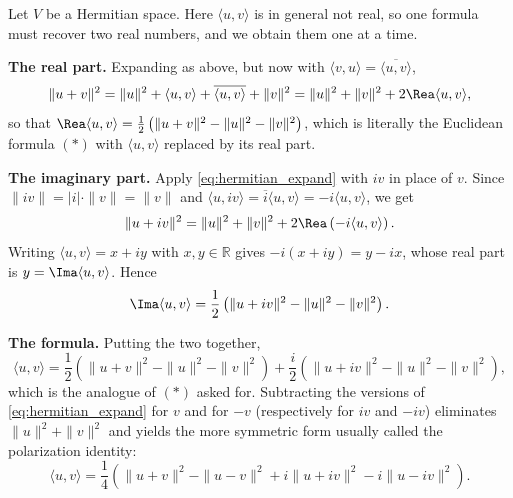 \begin{exercisesolution*}
\label{sol:polarization_b}
  Let $V$ be a Hermitian space. Here $\langle u, v \rangle$ is in general not real, so one formula must recover two real numbers, and we obtain them one at a time.

  \textbf{The real part.} Expanding as above, but now with $\langle v, u \rangle = \overline{\langle u, v \rangle}$,
  \begin{equation} \label{eq:hermitian_expand}
    \|u+v\|^2 = \|u\|^2 + \langle u, v \rangle + \overline{\langle u, v \rangle} + \|v\|^2 = \|u\|^2 + \|v\|^2 + 2 \Rea \langle u, v \rangle,
  \end{equation}
  so that $\Rea \langle u, v \rangle = \frac{1}{2}\left( \|u+v\|^2 - \|u\|^2 - \|v\|^2 \right)$, which is literally the Euclidean formula $(*)$ with $\langle u, v \rangle$ replaced by its real part.

  \textbf{The imaginary part.} Apply \eqref{eq:hermitian_expand} with $iv$ in place of $v$. Since $\|iv\| = |i| \cdot \|v\| = \|v\|$ and $\langle u, iv \rangle = \overline{i} \langle u, v \rangle = -i \langle u, v \rangle$, we get
  \[ \|u + iv\|^2 = \|u\|^2 + \|v\|^2 + 2 \Rea \left( -i \langle u, v \rangle \right). \]
  Writing $\langle u, v \rangle = x + iy$ with $x, y \in \mathbb{R}$ gives $-i(x+iy) = y - ix$, whose real part is $y = \Ima \langle u, v \rangle$. Hence
  \[ \Ima \langle u, v \rangle = \frac{1}{2}\left( \|u+iv\|^2 - \|u\|^2 - \|v\|^2 \right). \]

  \textbf{The formula.} Putting the two together,
  \[ \langle u, v \rangle = \frac{1}{2}\left( \|u+v\|^2 - \|u\|^2 - \|v\|^2 \right) + \frac{i}{2} \left( \|u+iv\|^2 - \|u\|^2 - \|v\|^2 \right), \]
  which is the analogue of $(*)$ asked for. Subtracting the versions of \eqref{eq:hermitian_expand} for $v$ and for $-v$ (respectively for $iv$ and $-iv$) eliminates $\|u\|^2 + \|v\|^2$ and yields the more symmetric form usually called the polarization identity:
  \[ \langle u, v \rangle = \frac{1}{4}\left( \|u+v\|^2 - \|u-v\|^2 + i\|u+iv\|^2 - i\|u-iv\|^2 \right). \]
\end{exercisesolution*}

